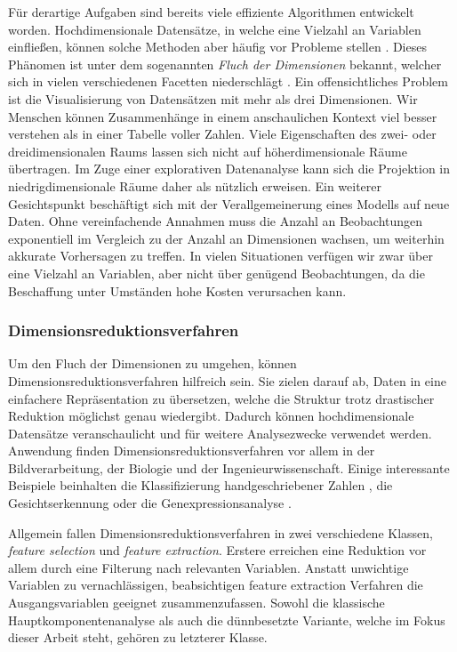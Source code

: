 Für derartige Aufgaben sind bereits viele effiziente Algorithmen entwickelt worden. Hochdimensionale Datensätze, in welche eine Vielzahl an Variablen einfließen, können solche Methoden aber häufig vor Probleme stellen \cite{donoho_high, donoho_observed}. Dieses Phänomen ist unter dem sogenannten \textit{Fluch der Dimensionen} bekannt, welcher sich in vielen verschiedenen Facetten niederschlägt \cite{bellman}. Ein offensichtliches Problem ist die Visualisierung von Datensätzen mit mehr als drei Dimensionen. Wir Menschen können Zusammenhänge in einem anschaulichen Kontext viel besser verstehen als in einer Tabelle voller Zahlen. Viele Eigenschaften des zwei- oder dreidimensionalen Raums lassen sich nicht auf höherdimensionale Räume übertragen. Im Zuge einer explorativen Datenanalyse kann sich die Projektion in niedrigdimensionale Räume daher als nützlich erweisen. Ein weiterer Gesichtspunkt beschäftigt sich mit der Verallgemeinerung eines Modells auf neue Daten. Ohne vereinfachende Annahmen muss die Anzahl an Beobachtungen exponentiell im Vergleich zu der Anzahl an Dimensionen wachsen, um weiterhin akkurate Vorhersagen zu treffen. In vielen Situationen verfügen wir zwar über eine Vielzahl an Variablen, aber nicht über genügend Beobachtungen, da die Beschaffung unter Umständen hohe Kosten verursachen kann. 




\subsubsection{Dimensionsreduktionsverfahren}

Um den Fluch der Dimensionen zu umgehen, können Dimensionsreduktionsverfahren hilfreich sein. Sie zielen darauf ab, Daten in eine einfachere Repräsentation zu übersetzen, welche die Struktur trotz drastischer Reduktion möglichst genau wiedergibt. Dadurch können hochdimensionale Datensätze veranschaulicht und für weitere Analysezwecke verwendet werden. Anwendung finden Dimensionsreduktionsverfahren vor allem in der Bildverarbeitung, der Biologie und der Ingenieurwissenschaft. Einige interessante Beispiele beinhalten die Klassifizierung handgeschriebener Zahlen \cite{hastie_elements}, die Gesichtserkennung \cite{hancock} oder die Genexpressionsanalyse \cite{alter}.

Allgemein fallen Dimensionsreduktionsverfahren in zwei verschiedene Klassen, \textit{feature selection} und \textit{feature extraction}. Erstere erreichen eine Reduktion vor allem durch eine Filterung nach relevanten Variablen. Anstatt unwichtige Variablen zu vernachlässigen, beabsichtigen feature extraction Verfahren die Ausgangsvariablen geeignet zusammenzufassen. Sowohl die klassische Hauptkomponentenanalyse als auch die dünnbesetzte Variante, welche im Fokus dieser Arbeit steht, gehören zu letzterer Klasse.


